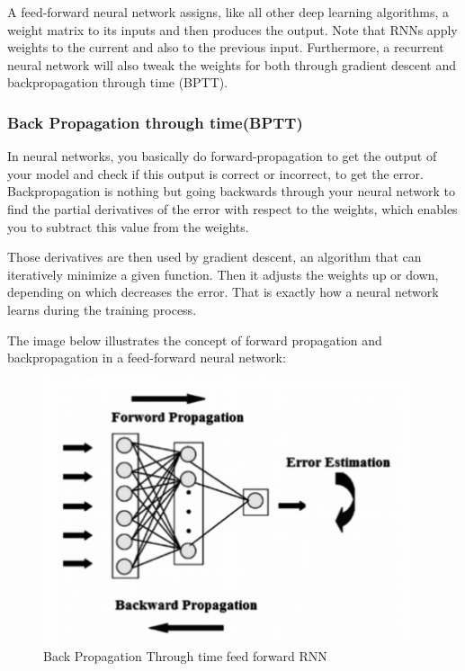 \documentclass[12pt]{report}
\begin{document}
A feed-forward neural network assigns, like all other deep learning algorithms, a weight matrix to its inputs and then produces the output. Note that RNNs apply weights to the current and also to the previous input. Furthermore, a recurrent neural network will also tweak the weights for both through gradient descent and backpropagation through time (BPTT). 

\subsubsection{Back Propagation through time(BPTT)}

In neural networks, you basically do forward-propagation to get the output of your model and check if this output is correct or incorrect, to get the error. Backpropagation is nothing but going backwards through your neural network to find the partial derivatives of the error with respect to the weights, which enables you to subtract this value from the weights.

Those derivatives are then used by gradient descent, an algorithm that can iteratively minimize a given function. Then it adjusts the weights up or down, depending on which decreases the error. That is exactly how a neural network learns during the training process.

The image below illustrates the concept of forward propagation and backpropagation in a feed-forward neural network:

\begin{figure}[H]%
  \begin {center}
  \includegraphics[width=0.95\textwidth]{images/bptt.png}
  \caption{Back Propagation Through time feed forward RNN}
  \label{fig:ecg}
  \end {center}
\end{figure}
\end{document}
